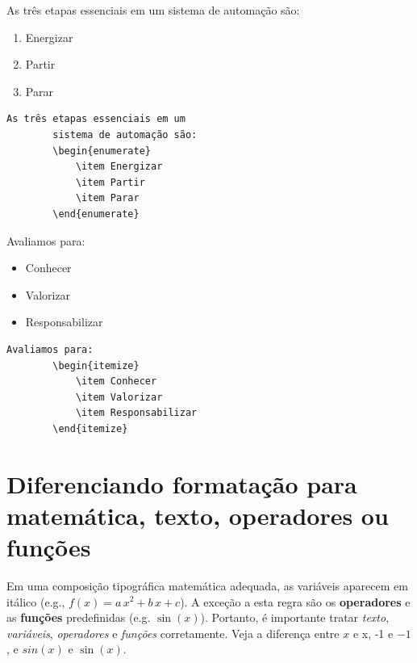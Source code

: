 \begin{multicols}{2}
	As três etapas essenciais em um sistema de automação são:
	\begin{enumerate}
		\item Energizar
		\item Partir
		\item Parar
	\end{enumerate}
	\vfill\null 
	\columnbreak
	\begin{lstlisting}[language={[Latex]Tex},frame=single]
		As três etapas essenciais em um 
		sistema de automação são:
		\begin{enumerate}
			\item Energizar
			\item Partir
			\item Parar
		\end{enumerate}
	\end{lstlisting}
\end{multicols}
\begin{multicols}{2}
	Avaliamos para:
	\begin{itemize}
		\item Conhecer
		\item Valorizar
		\item Responsabilizar
	\end{itemize}
		\vfill\null 
	\columnbreak
	\begin{lstlisting}[language={[Latex]Tex},frame=single]
		Avaliamos para:
		\begin{itemize}
			\item Conhecer
			\item Valorizar
			\item Responsabilizar
		\end{itemize}
	\end{lstlisting}
\end{multicols}

\section{Diferenciando formatação para matemática, texto, operadores ou funções}
Em uma composição tipográfica matemática adequada, as variáveis aparecem em itálico (e.g., $ f(x)=a\, x^2+ b\,x+c$). A exceção a esta regra são os \textbf{operadores} e  as \textbf{funções} predefinidas (e.g. $ \sin(x) $). Portanto, é importante  tratar \emph{texto}, \emph{variáveis}, \emph{operadores} e \emph{funções} corretamente. Veja a diferença entre $x$ e x, -1 e $-1$, e $sin(x)$ e $\sin(x)$.

